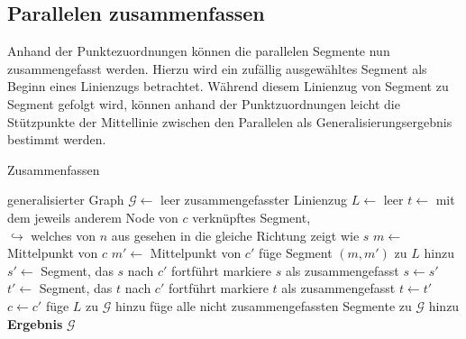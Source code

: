 \documentclass[../main/thesis.tex]{subfiles}
\begin{document}
\subsection{Parallelen zusammenfassen}
\label{ch:generalisation-algorithm}

%

Anhand der Punktezuordnungen können die parallelen Segmente nun zusammengefasst werden.
Hierzu wird ein zufällig ausgewähltes Segment als Beginn eines Linienzugs betrachtet.
Während diesem Linienzug von Segment zu Segment gefolgt wird, können anhand der Punktzuordnungen leicht die Stützpunkte der Mittellinie zwischen den Parallelen als Generalisierungsergebnis bestimmt werden.

\begin{algorithmhere}{Zusammenfassen}
\label{alg:Zusammenfassen}
\begin{algorithmic}
	\State generalisierter Graph $\mathcal{G} \gets$ leer
			\State zusammengefasster Linienzug $L \gets$ leer
			\State $t \gets$ mit dem jeweils anderem Node von $c$ verknüpftes Segment,\\\qquad\qquad\qquad\quad$\hookrightarrow$ welches von $n$ aus gesehen in die gleiche Richtung zeigt wie $s$
				\State $m \gets$ Mittelpunkt von $c$
				\State $m' \gets$ Mittelpunkt von $c'$
				\State füge Segment $(m, m')$ zu $L$ hinzu
				\State $s' \gets$ Segment, das $s$ nach $c'$ fortführt
					\State markiere $s$ als zusammengefasst
					\State $s \gets s'$
				\EndIf
				\State $t' \gets$ Segment, das $t$ nach $c'$ fortführt
					\State markiere $t$ als zusammengefasst
					\State $t \gets t'$
				\EndIf
				\State $c \gets c'$
			\EndWhile
			\State füge $L$ zu $\mathcal{G}$ hinzu
		\EndFor
	\EndFor
	\State füge alle nicht zusammengefassten Segmente zu $\mathcal{G}$ hinzu
	\State \textbf{Ergebnis} $\mathcal{G}$
\EndFunction
\end{algorithmic}
\end{algorithmhere}
\end{document}
